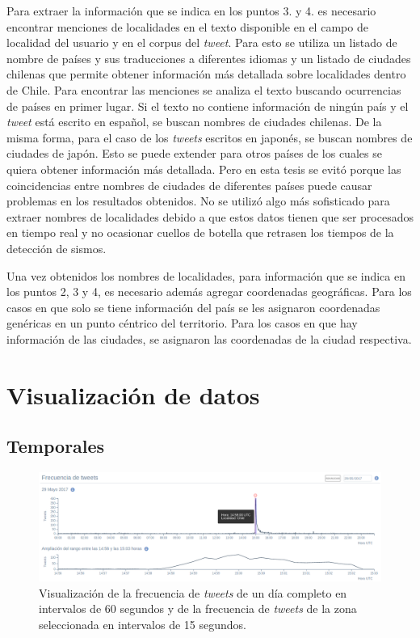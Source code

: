 Para extraer la información que se indica en los puntos 3. y 4. es necesario encontrar menciones de localidades en el texto disponible en el campo de localidad del usuario y en el corpus del \textit{tweet}. 
%
Para esto se utiliza un listado de nombre de países y sus traducciones a diferentes idiomas y un listado de ciudades chilenas que permite obtener información más detallada sobre localidades dentro de Chile. 
%
Para encontrar las menciones se analiza el texto buscando ocurrencias de países en primer lugar. Si el texto no contiene información de ningún país y el \textit{tweet} está escrito en español, se buscan nombres de ciudades chilenas. De la misma forma, para el caso de los \textit{tweets} escritos en japonés, se buscan nombres de ciudades de japón. 
%
Esto se puede extender para otros países de los cuales se quiera obtener información más detallada. Pero en esta tesis se evitó porque las coincidencias entre nombres de ciudades de diferentes países puede causar problemas en los resultados obtenidos. 
%
No se utilizó algo más sofisticado para extraer nombres de localidades debido a que estos datos tienen que ser procesados en tiempo real y no ocasionar cuellos de botella que retrasen los tiempos de la detección de sismos.

	
Una vez obtenidos los nombres de localidades, para información que se indica en los puntos 2, 3 y 4, es necesario además agregar coordenadas geográficas.
%
Para los casos en que solo se tiene información del país se les asignaron coordenadas genéricas en un punto céntrico del territorio. 
%
Para los casos en que hay información de las ciudades, se asignaron las coordenadas de la ciudad respectiva. 


\section{Visualización de datos}
\label{sec:visualizacion}
	\subsection{Temporales}
	
	\begin{figure}[ht]
	  \centering
	  \includegraphics[trim={0 0 0 0}, clip, width=\textwidth]{imagenes/linea_de_tiempo_interactive.png}
	  \caption{Visualización de la frecuencia de \textit{tweets} de un día completo en intervalos de 60 segundos y de la frecuencia de \textit{tweets} de la zona seleccionada en intervalos de 15 segundos.}
	\label{fig:timeline}
	\end{figure}
		
